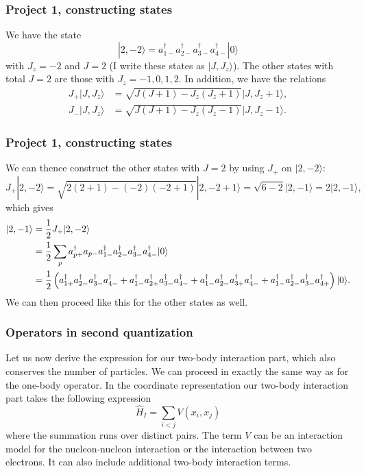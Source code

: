 \documentclass[compress]{beamer}
\newcommand*{\ket}[1]{|#1\rangle}
\begin{document}
\frame
{
\frametitle{Project 1, constructing states}

\begin{small}
{\scriptsize
We have the state
\begin{equation}
\ket{2,-2} = a_{1-}^{\dagger} a_{2-}^{\dagger}
a_{3-}^{\dagger} a_{4-}^{\dagger} \ket{0}
\label{eq:2,-2}
\end{equation}
with $J_z = -2$ and $J = 2$ (I write these states as $\ket{J,J_z}$). The other states with total $J = 2$ are those with $J_z = -1,0,1,2$. In addition, we have the relations
\begin{align}
J_+ \ket{J,J_z} &= \sqrt{J(J+1) - J_z(J_z + 1)} \ket{J,J_z + 1},
\label{eq:J+ket} \\
J_- \ket{J,J_z} &= \sqrt{J(J+1) - J_z(J_z - 1)} \ket{J,J_z - 1}.
\label{eq:J-ket}
\end{align}
}
\end{small}
}


\frame
{
\frametitle{Project 1, constructing states}

\begin{small}
{\scriptsize
We can thence construct the other states  with $J = 2$ by using  $J_+$ on $\ket{2,-2}$:
\[ J_+ \ket{2,-2} = \sqrt{2(2+1) - (-2)(-2+1)} \ket{2,-2+1} =
\sqrt{6 - 2} \ket{2,-1} = 2\ket{2,-1}, \]
which gives
\begin{align}
\ket{2,-1} &= \frac{1}{2} J_+ \ket{2,-2} \notag \\
%
&= \frac{1}{2} \sum_p a_{p+}^\dagger a_{p-} a_{1-}^{\dagger} a_{2-}^{\dagger}
a_{3-}^{\dagger} a_{4-}^{\dagger} \ket{0} \notag \\
%
&= \frac{1}{2} \left(
a_{1+}^{\dagger} a_{2-}^{\dagger} a_{3-}^{\dagger} a_{4-}^{\dagger} +
a_{1-}^{\dagger} a_{2+}^{\dagger} a_{3-}^{\dagger} a_{4-}^{\dagger} +
a_{1-}^{\dagger} a_{2-}^{\dagger} a_{3+}^{\dagger} a_{4-}^{\dagger} +
a_{1-}^{\dagger} a_{2-}^{\dagger} a_{3-}^{\dagger} a_{4+}^{\dagger}
\right) \ket{0}. \label{eq:2,-1}
\end{align}
We can then proceed like this for the other states as well.
%
}
\end{small}
}



\frame
{
  \frametitle{Operators in second quantization}
\begin{small}
{\scriptsize
Let us now derive the expression for our two-body interaction part, which also conserves the number of particles.
We can proceed in exactly the same way as for the one-body operator. In the coordinate representation our
two-body interaction part takes the following expression
\begin{equation}
	\hat{H}_I = \sum_{i<j} V(x_i,x_j) \label{eq:2-31}
\end{equation}
where the summation runs over distinct pairs. The term $V$ can be an interaction model for the nucleon-nucleon interaction
or the interaction between two electrons. It can also include additional two-body interaction terms. 
}
\end{small}
}
\end{document}
